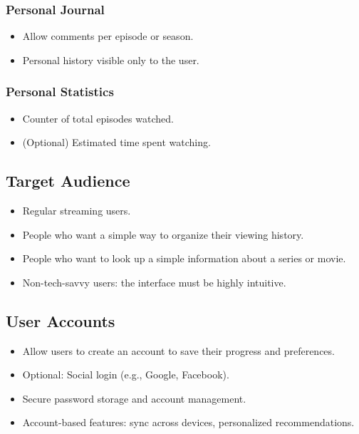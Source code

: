 \subsubsection{Personal Journal}
\begin{itemize}
    \item Allow comments per episode or season.
    \item Personal history visible only to the user.
\end{itemize}

\subsubsection{Personal Statistics}
\begin{itemize}
    \item Counter of total episodes watched.
    \item (Optional) Estimated time spent watching.
\end{itemize}

\subsection{Target Audience}
\begin{itemize}
    \item Regular streaming users.
    \item People who want a simple way to organize their viewing history.
    \item People who want to look up a simple information about a series or movie.
    \item Non-tech-savvy users: the interface must be highly intuitive.
\end{itemize}

\subsection{User Accounts}
\begin{itemize}
    \item Allow users to create an account to save their progress and preferences.
    \item Optional: Social login (e.g., Google, Facebook).
    \item Secure password storage and account management.
    \item Account-based features: sync across devices, personalized recommendations.
\end{itemize}

